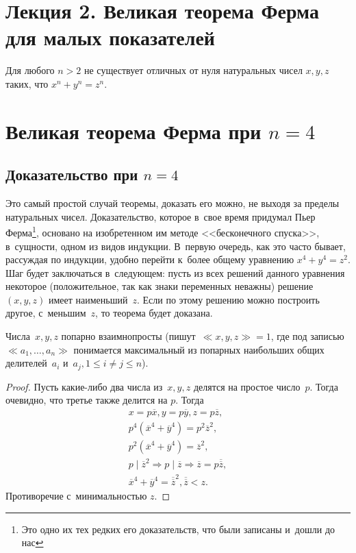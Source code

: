 \documentclass{article}
\begin{document}
\section*{Лекция 2. Великая теорема Ферма для малых показателей}
\resetcntrs

\begin{theorem}[Ферма]
  Для любого $n > 2$ не существует отличных от нуля натуральных чисел
  $x, y, z$ таких, что $x^n + y^n = z^n$.
\end{theorem}

\section{Великая теорема Ферма при $n = 4$}

\subsection{Доказательство при $n = 4$}

Это самый простой случай теоремы, доказать его можно, не выходя за пределы
натуральных чисел. Доказательство, которое в~свое время придумал Пьер
Ферма\footnote{Это одно их тех редких его доказательств, что были записаны
и~дошли до нас}, основано на изобретенном им методе <<бесконечного спуска>>,
в~сущности, одном из видов индукции. В~первую очередь, как это часто бывает,
рассуждая по индукции, удобно перейти к~более общему уравнению $x^4+y^4=z^2$.
Шаг будет заключаться в~следующем: пусть из всех решений данного уравнения
некоторое (положительное, так как знаки переменных неважны) решение~$(x, y, z)$
имеет наименьший~$z$. Если по этому решению можно построить другое,
с~меньшим~$z$, то теорема будет доказана.

\begin{claim}
Числа~$x, y, z$ попарно взаимнопросты (пишут~$\ll\!x, y, z\!\gg = 1$, где под
записью~$\ll\!a_1, \ldots, a_n\!\gg$ понимается максимальный из попарных
наибольших общих делителей~$a_i$ и~$a_j, 1 \le i \ne j \le n$).
\end{claim}
\begin{proof}
  Пусть какие-либо два числа из~$x, y, z$ делятся на простое число~$p$.
  Тогда очевидно, что третье также делится на $p$. Тогда
  \begin{gather*}
    x = p \overline{x}, y = p \overline{y}, z = p \overline{z},\\
    p^4 (\overline{x}^4 + \overline{y}^4) = p^2 \overline{z}^2,\\
    p^2 (\overline{x}^4 + \overline{y}^4) = \overline{z}^2,\\
    p \mid \overline{z}^2 \Rightarrow p \mid \overline{z} \Rightarrow
    \overline{z} = p \overline{\overline{z}},\\
    \overline{x}^4 + \overline{y}^4 = \overline{\overline{z}}^2,
    \overline{\overline{z}} < z.
  \end{gather*}
  Противоречие с~минимальностью $z$.
\end{proof}
\end{document}
